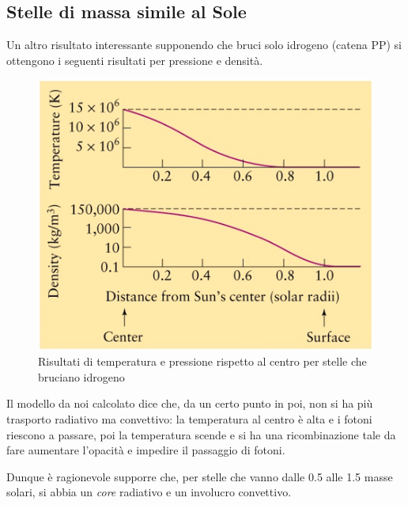 \documentclass[a4paper,11pt]{article}
\begin{document}
\subsection{Stelle di massa simile al Sole}

Un altro risultato interessante supponendo che bruci solo idrogeno (catena PP) si ottengono i seguenti risultati per pressione e densità.

\begin{figure}[H]
    \centering
    \includegraphics[scale=0.6]{tempdens.png}
    \caption{Risultati di temperatura e pressione rispetto al centro per stelle che bruciano idrogeno}
\end{figure}

Il modello da noi calcolato dice che, da un certo punto in poi, non si ha più trasporto radiativo ma convettivo: la temperatura al centro è alta e i fotoni riescono a passare, poi la temperatura scende e si ha una ricombinazione tale da fare aumentare l'opacità e impedire il passaggio di fotoni.

Dunque è ragionevole supporre che, per stelle che vanno dalle 0.5 alle 1.5 masse solari, si abbia un \textit{core} radiativo e un involucro convettivo.
\end{document}
